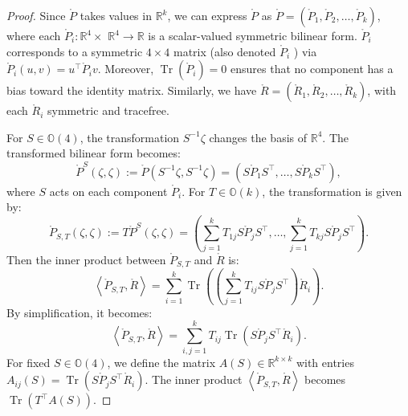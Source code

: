 \documentclass[11pt,letterpaper]{amsart}
\theoremstyle{definition}
\theoremstyle{remark}
\numberwithin{equation}{section}
\begin{document}
\begin{proof}
Since $\mathring{P}$ takes values in $\mathbb{R}^k$,  we can  express $\mathring{P}$ as $\mathring{P}=\left(\mathring{P}_1, \mathring{P}_2, \ldots, \mathring{P}_k\right)$, where each $\mathring{P}_i: \mathbb{R}^4 \times$ $\mathbb{R}^4 \rightarrow \mathbb{R}$ is a scalar-valued symmetric bilinear form. $\mathring{P}_i$ corresponds to a symmetric $4 \times 4$ matrix (also denoted $\mathring{P}_i$ ) via $\mathring{P}_i(u, v)=u^{\top} \mathring{P}_i v$. Moreover, $\operatorname{Tr}\left(\mathring{P}_i\right)=0$ ensures that no component has a bias toward the identity matrix. Similarly, we have
$\mathring{R}=\left(\mathring{R}_1, \mathring{R}_2, \ldots, \mathring{R}_k\right)$, with each $\mathring{R}_i$ symmetric and tracefree.

For $S \in \mathbb{O}(4)$, the transformation $S^{-1} \zeta$ changes the basis of $\mathbb{R}^4$.
The transformed bilinear form becomes:
\begin{equation}
\mathring{P}^S(\zeta, \zeta):=\mathring{P}\left(S^{-1} \zeta, S^{-1} \zeta\right)=\left(S \mathring{P}_1 S^{\top}, \ldots, S \mathring{P}_k S^{\top}\right), 
\end{equation}
where $S$ acts on each component $\mathring{P}_i$.
For $T \in \mathbb{O}(k)$, the transformation is given by:
\begin{equation}
\mathring{P}_{S, T}(\zeta, \zeta):=T \mathring{P}^S(\zeta, \zeta)=\left(\sum_{j=1}^k T_{1 j} S \mathring{P}_j S^{\top}, \ldots, \sum_{j=1}^k T_{k j} S \mathring{P}_j S^{\top}\right). 
\end{equation}
Then the inner product between $\mathring{P}_{S, T}$ and $\mathring{R}$ is:
\begin{equation}
\left\langle \mathring{P}_{S, T}, \mathring{R}\right\rangle=\sum_{i=1}^k \operatorname{Tr}\left(\left(\sum_{j=1}^k T_{i j} S \mathring{P}_j S^{\top}\right) \mathring{R}_i\right).
\end{equation}
By simplification, it becomes:
\begin{equation}
\left\langle \mathring{P}_{S, T}, \mathring{R}\right\rangle=\sum_{i, j=1}^k T_{i j} \operatorname{Tr}\left(S \mathring{P}_j S^{\top} \mathring{R}_i\right).
\end{equation}
For fixed $S \in \mathbb{O}(4)$, we define the matrix $A(S) \in \mathbb{R}^{k \times k}$ with entries $A_{i j}(S)=\operatorname{Tr}\left(S \mathring{P}_j S^{\top} \mathring{R}_i\right)$. The inner product $\left\langle \mathring{P}_{S, T}, \mathring{R}\right\rangle$ becomes $\operatorname{Tr}\left(T^{\top} A(S)\right)$.


\end{proof}
\end{document}
